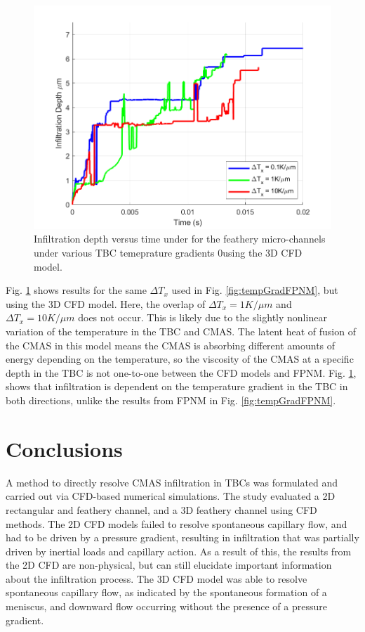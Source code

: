 \documentclass[%
 aip,
 amsmath,amssymb,
 reprint,%
floatfix]{revtex4-1}
\begin{document}
\begin{figure}
    \centering
    \includegraphics[width=\linewidth]{Figures/tempGradStudyCFD.png}
    \caption{Infiltration depth versus time under for the feathery micro-channels under various TBC temeprature gradients 0using the 3D CFD model.}
    \label{fig:tempGradCFD}
\end{figure}

Fig. \ref{fig:tempGradCFD} shows results for the same $\Delta T_{x}$ used in Fig. \ref{fig:tempGradFPNM}, but using the 3D CFD model. Here, the overlap of $\Delta T_{x} = 1 K/\mu m$ and $\Delta T_{x} = 10 K/\mu m$ does not occur. This is likely due to the slightly nonlinear variation of the temperature in the TBC and CMAS. The latent heat of fusion of the CMAS in this model means the CMAS is absorbing different amounts of energy depending on the temperature, so the viscosity of the CMAS at a specific depth in the TBC is not one-to-one between the CFD models and FPNM.  Fig. \ref{fig:tempGradCFD}, shows that infiltration is dependent on the temperature gradient in the TBC in both directions, unlike the results from FPNM in Fig. \ref{fig:tempGradFPNM}. 

\section{Conclusions}
A method to directly resolve CMAS infiltration in TBCs was formulated and carried out via CFD-based numerical simulations. 
The study evaluated a 2D rectangular and feathery channel, and a 3D feathery channel using CFD methods. 
The 2D CFD models failed to resolve spontaneous capillary flow, and had to be driven by a pressure gradient, resulting in infiltration that was partially driven by inertial loads and capillary action.
As a result of this, the results from the 2D CFD are non-physical, but can still elucidate important information about the infiltration process.
The 3D CFD model was able to resolve spontaneous capillary flow, as indicated by the spontaneous formation of a meniscus, and downward flow occurring without the presence of a pressure gradient.
\end{document}
